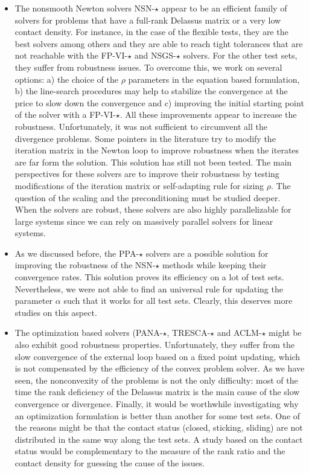 \begin{itemize}
\item The nonsmooth Newton solvers {\sf NSN-$\star$} appear to be an efficient family of solvers for problems that have a full-rank Delassus matrix or a very low contact density. For instance, in the case of the flexible tests, they are the best solvers among others and they are able to reach tight tolerances that are not reachable with the {\sf FP-VI-$\star$}  and {\sf NSGS-$\star$} solvers. For the other test sets, they suffer from robustness issues. To overcome this, we work on several options:  a) the choice of the $\rho$ parameters in the equation based formulation, b) the line-search procedures may help to stabilize the convergence at the price to slow down the convergence and c) improving the initial starting point of the solver with a {\sf FP-VI-$\star$}. All these improvements appear to increase the robustness. Unfortunately, it was not sufficient to circumvent all the divergence problems. Some pointers in the literature try to modify the iteration matrix in the Newton loop to improve robustness when the iterates are far form the solution. This solution has still not been tested. The main perspectives for these solvers are to improve their robustness by testing modifications of the iteration matrix or self-adapting rule for sizing $\rho$. The question of the scaling and the preconditioning must be studied deeper. When the solvers are robust, these solvers are also highly parallelizable for large systems since we can rely on massively parallel solvers for linear systems.

\item As we discussed before, the {\sf PPA-$\star$} solvers are a possible solution for improving the robustness of the {\sf NSN-$\star$} methods while keeping their convergence rates. This solution proves its efficiency on a lot of test sets. Nevertheless, we were not able to find an universal rule for updating the parameter $\alpha$ such that it works for all test sets. Clearly, this deserves more studies  on this aspect.

\item The optimization based solvers ({\sf PANA-$\star$, TRESCA-$\star$ and ACLM-$\star$} might be also exhibit good robustness properties. Unfortunately, they suffer from the slow convergence of the external loop based on a fixed point updating, which is not compensated by the efficiency of the convex problem solver. As we have seen, the nonconvexity of the problems is not the only difficulty: most of the time the rank deficiency of the Delassus matrix is the main cause of the slow convergence or divergence. Finally, it would be worthwhile investigating why an optimization formulation is better than another for some test sets. One of the reasons might be that the contact status (closed, sticking, sliding) are not distributed in the same  way along the test sets. A study based on the contact status would be complementary to the measure of the rank ratio and the contact density for guessing the cause of the issues.


\end{itemize}




